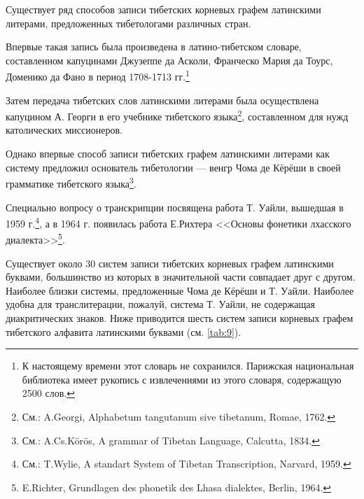 Существует ряд способов записи тибетских корневых графем латинскими литерами, предложенных тибетологами различных стран.

Впервые такая запись была произведена в латино-тибетском словаре, составленном капуцинами Джузеппе да Асколи, Франческо Мария да Тоурс, Доменико да Фано в период 1708-1713 гг.\footnote[12]{К настоящему времени этот словарь не сохранился. Парижская национальная библиотека имеет рукопись с извлечениями из этого словаря, содержащую 2500 слов.}

Затем передача тибетских слов латинскими литерами была осуществлена капуцином А. Георги в его учебнике тибетского языка\footnote[13]{См.: A.Georgi, Alphabetum tangutanum sive tibetanum, Romae, 1762.}, составленном для нужд католических миссионеров.

Однако впервые способ записи тибетских графем латинскими литерами как систему предложил основатель тибетологии --- венгр Чома де Кёрёши в своей грамматике тибетского языка\footnote[14]{См.: A.Cs.Körös, A grammar of Tibetan Language, Calcutta, 1834.}.

Специально вопросу о транскрипции посвящена работа Т. Уайли, вышедшая в 1959 г.\footnote[15]{См.: T.Wylie, A standart System of Tibetan Transcription, Narvard, 1959.}, а в 1964 г. появилась работа Е.Рихтера <<Основы фонетики лхасского диалекта>>\footnote[16]{E.Richter, Grundlagen des phonetik des Lhasa dialektes, Berlin, 1964.}.

Существует около 30 систем записи тибетских корневых графем латинскими буквами, большинство из которых в значительной части совпадает друг с другом. Наиболее близки системы, предложенные Чома де Кёрёши и Т. Уайли. Наиболее удобна для транслитерации, пожалуй, система Т. Уайли, не содержащая диакритических знаков. Ниже приводится шесть систем записи корневых графем тибетского алфавита латинскими буквами (см. \ref{tab:9}).

